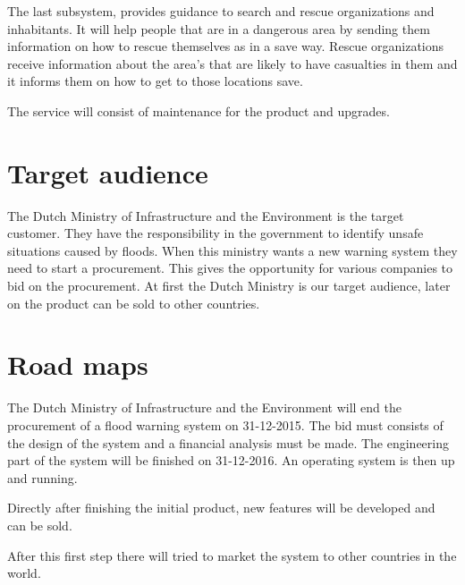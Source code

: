 The last subsystem, provides guidance to search and rescue organizations and inhabitants. It will help people that are in a dangerous area by sending them information on how to rescue themselves as in a save way. Rescue organizations  receive information about the area's that are likely to have casualties in them and it informs them on how to get to those locations save.

The service will consist of maintenance for the product and upgrades.

\section{Target audience}
The Dutch Ministry of Infrastructure and the Environment is the target customer. They have the responsibility in the government to identify unsafe situations caused by floods. When this ministry wants a new warning system they need to start a procurement. This gives the opportunity for various companies to bid on the procurement. At first the Dutch Ministry is our target audience, later on the product can be sold to other countries.


\section{Road maps}
The Dutch Ministry of Infrastructure and the Environment will end the procurement of a flood warning system on 31-12-2015. The bid must consists of the design of the system and a financial analysis must be made. The engineering part of the system will be finished on 31-12-2016. An operating system is then up and running.

Directly after finishing the initial product, new features will be developed and can be sold.

After this first step there will tried to market the system to other countries in the world. 

